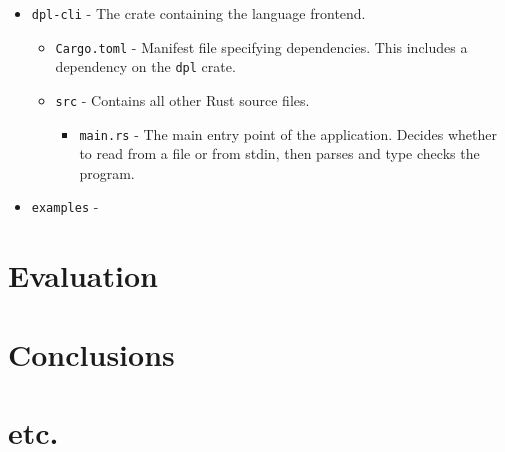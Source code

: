 \documentclass[12pt,a4paper,twoside]{report}
\begin{document}
\begin{itemize}
\begin{itemize}
\begin{itemize}
        \end{itemize}
    \end{itemize}
    \item \texttt{dpl-cli} - The crate containing the language frontend.
    \begin{itemize}
        \item \texttt{Cargo.toml} - Manifest file specifying dependencies. This includes a dependency on the \texttt{dpl} crate.
        \item \texttt{src} - Contains all other Rust source files.
        \begin{itemize}
            \item \texttt{main.rs} - The main entry point of the application. Decides whether to read from a file or from stdin, then parses and type checks the program.
        \end{itemize}
    \end{itemize}
    \item \texttt{examples} - 
\end{itemize}


\chapter{Evaluation}



\chapter{Conclusions}


\chapter*{etc.}



\end{document}
